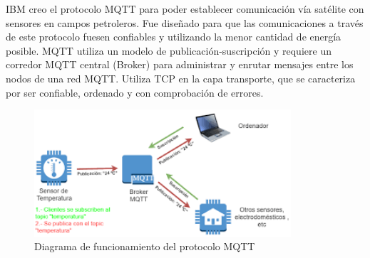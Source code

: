 IBM creo el protocolo MQTT para poder establecer comunicación vía satélite con sensores en campos petroleros. Fue diseñado para que las comunicaciones a través de este protocolo fuesen confiables y utilizando la menor cantidad de energía posible. MQTT utiliza un modelo de publicación-suscripción y requiere un corredor MQTT central (Broker) para administrar y enrutar mensajes entre los nodos de una red MQTT. Utiliza TCP en la capa transporte, que se caracteriza por ser confiable, ordenado y con comprobación de errores.\cite{iotprocolslinkedin}\\

\begin{figure}[ht]
\centering
\includegraphics[width=0.85\textwidth]{./Figuras/mqtt.png}
\caption{\label{fig:mqttprotocol}Diagrama de funcionamiento del protocolo MQTT}
\vspace*{-10pt}
\end{figure}

